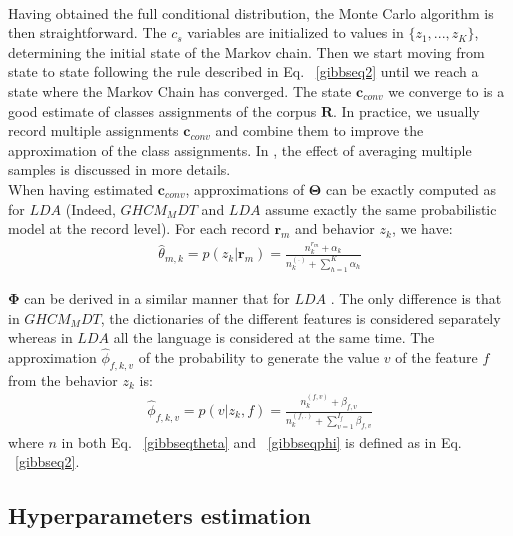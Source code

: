 \\Having obtained the full conditional distribution, the Monte Carlo algorithm is then straightforward. The $c_{s}$ variables are initialized to values in $\{z_{1},...,z_{K}\}$, determining the initial state of the Markov chain. Then we start moving from state to state following the rule described in Eq. ~\eqref{gibbseq2} until we reach a state where the Markov Chain has converged. The state $\mathbf{c}_{conv}$ we converge to is a good estimate of classes assignments of the corpus $\mathbf{R}$. In practice, we usually record multiple assignments $\mathbf{c}_{conv}$ and combine them to improve the approximation of the class assignments. In \cite{inferencecomp}, the effect of averaging multiple samples is discussed in more details.
\\When having estimated $\mathbf{c}_{conv}$, approximations of $\boldsymbol{\Theta }$ can be exactly computed as for $LDA$ \cite{gibbs} (Indeed, $GHCM_MDT$ and $LDA$ assume exactly the same probabilistic model at the record level). For each record $\mathbf{r}_{m}$ and behavior $z_{k}$, we have:
\begin{equation}\label{gibbseqtheta}
\begin{split} 
\widehat{\theta}_{m,k}= p(z_{k}|\mathbf{r}_{m})= \frac{n^{r_{m}}_{k}+\alpha _{k}}{n^{(.)}_{k}+\sum_{h=1}^{K}\alpha _{h}}
\end{split} 
\end{equation}

$\boldsymbol{\Phi }$ can be derived in a similar manner that for $LDA$ \cite{gibbs}. The only difference is that in $GHCM_MDT$, the dictionaries of the different features is considered separately whereas in $LDA$ all the language is considered at the same time. The approximation $\widehat{\phi}_{f,k,v}$ of the probability to generate the value $v$ of the feature $f$ from the behavior $z_{k}$ is:
\begin{equation}\label{gibbseqphi}
\begin{split} 
\widehat{\phi}_{f,k,v}= p(v|z_{k},f)= \frac{n^{(f,v)}_{k}+\beta _{f,v}}{n^{(f,.)}_{k}+\sum_{v=1}^{I_{f}}\beta _{f,v}}
\end{split} 
\end{equation}
where $n$ in both Eq. ~\eqref{gibbseqtheta} and ~\eqref{gibbseqphi} is defined as in Eq. ~\eqref{gibbseq2}.


\subsection{Hyperparameters estimation}

